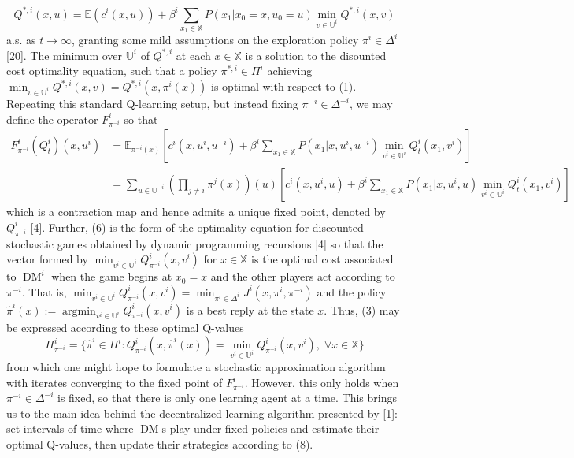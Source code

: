 \documentclass[10pt]{article}
\newcommand{\E}{\mathbb{E}}
\newcommand{\mbb}[1]{\mathbb{#1}}
\newcommand{\1}[1]{\mathbbm{1}_{#1}}
\DeclareMathOperator{\DM}{DM}
\DeclareMathOperator{\argmin}{argmin}
\begin{document}
\[Q^{\ast,i}(x,u)=\E(c^i(x,u))+\beta^i\sum_{x_1\in\mbb{X}}P(x_1|x_0=x,u_0=u)\min_{v\in\mbb{U}^i}Q^{\ast,i}(x,v)\tag{5}\]
a.s. as $t\rightarrow\infty$, granting some mild assumptions on the exploration policy $\pi^i\in\Delta^i$ [20]. The minimum over $\mbb{U}^i$ of $Q^{\ast,i}$ at each $x\in\mbb{X}$ is a solution to the disounted cost optimality equation, such that a policy $\pi^{\ast,i}\in\Pi^i$ achieving $\min_{v\in\mbb{U}^i}Q^{\ast,i}(x,v)=Q^{\ast,i}(x,\pi^i(x))$ is optimal with respect to (1). Repeating this standard Q-learning setup, but instead fixing $\pi^{-i}\in\Delta^{-i}$, we may define the operator $F^i_{\pi^{-i}}$ so that
\begin{align*}
    F^i_{\pi^{-i}}(Q_t^i)(x,u^i)&=\E_{\pi^{-i}(x)}\left[c^i(x,u^i,u^{-i})+\beta^i\sum_{x_1\in\mbb{X}}P(x_1|x,u^i,u^{-i})\min_{v^i\in\mbb{U}^i}Q_t^i(x_1,v^i)\right]\tag{6}\\
    &=\sum_{u\in\mbb{U}^{-i}}\left(\prod_{j\neq i}\pi^j(x)\right)(u)\left[c^i(x,u^i,u)+\beta^i\sum_{x_1\in\mbb{X}}P(x_1|x,u^i,u)\min_{v^i\in\mbb{U}^i}Q_t^i(x_1,v^i)\right]\tag{7}
\end{align*}
which is a contraction map and hence admits a unique fixed point, denoted by $Q^i_{\pi^{-i}}$ [4]. Further, (6) is the form of the optimality equation for discounted stochastic games obtained by dynamic programming recursions [4] so that the vector formed by $\min_{v^i\in\mbb{U}^i}Q^i_{\pi^{-i}}(x,v^i)$ for $x\in\mbb{X}$ is the optimal cost associated to $\DM^i$ when the game begins at $x_0=x$ and the other players act according to $\pi^{-i}$.
That is, $\min_{v^i\in\mbb{U}^i}Q^i_{\pi^{-i}}(x,v^i)=\min_{\pi^i\in\Delta^i}J^i(x,\pi^i,\pi^{-i})$ and the policy $\hat{\pi}^i(x):=\argmin_{v^i\in\mbb{U}^i}Q^i_{\pi^{-i}}(x,v^i)$ is a best reply at the state $x$. Thus, (3) may be expressed according to these optimal Q-values
\[\Pi^i_{\pi^{-i}}=\{\hat{\pi}^i\in\Pi^i:Q^i_{\pi^{-i}}(x,\hat{\pi}^i(x))=\min_{v^i\in\mbb{U}^i}Q^i_{\pi^{-i}}(x,v^i),\;\forall x\in\mbb{X}\}\tag{8}\]
from which one might hope to formulate a stochastic approximation algorithm with iterates converging to the fixed point of $F^i_{\pi^{-i}}$. However, this only holds when $\pi^{-i}\in\Delta^{-i}$ is fixed, so that there is only one learning agent at a time.
This brings us to the main idea behind the decentralized learning algorithm presented by [1]: set intervals of time where $\DM$s play under fixed policies and estimate their optimal Q-values, then update their strategies according to (8).
\end{document}

